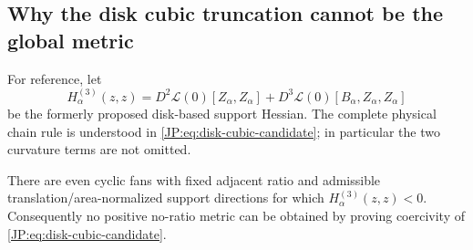 \subsection{Why the disk cubic truncation cannot be the global metric}

For reference, let
\begin{equation}\label{JP:eq:disk-cubic-candidate}
 H^{(3)}_\alpha(z,z)
 =D^2\mathcal L(0)[Z_\alpha,Z_\alpha]
  +D^3\mathcal L(0)[B_\alpha,Z_\alpha,Z_\alpha]
\end{equation}
be the formerly proposed disk-based support Hessian.  The complete physical
chain rule is understood in \eqref{JP:eq:disk-cubic-candidate}; in particular
the two curvature terms are not omitted.

\begin{proposition}
\label{JP:prop:cubic-counterexample}
There are even cyclic fans with fixed adjacent ratio and admissible
translation/area-normalized support directions for which
$H^{(3)}_\alpha(z,z)<0$.  Consequently no positive no-ratio metric can be
obtained by proving coercivity of \eqref{JP:eq:disk-cubic-candidate}.
\end{proposition}


